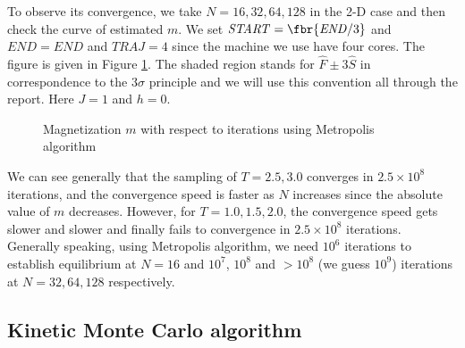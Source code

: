 \documentclass[english, nochinese]{pnote}
\begin{document}
To observe its convergence, we take $ N = 16, 32, 64, 128 $ in the 2-D case and then check the curve of estimated $m$. We set $ \mathit{START} = \fbr{ \mathit{END} / 3 } $ and $ \mathit{END} = \mathit{END} $ and $ \mathit{TRAJ} = 4 $ since the machine we use have four cores. The figure is given in Figure \ref{Fig:Metro}. The shaded region stands for $ \hat{F} \pm 3 \hat{S} $ in correspondence to the $ 3 \sigma $ principle and we will use this convention all through the report. Here $ J = 1 $ and $ h = 0 $.

\begin{figure}[htbp]
\centering
\scalebox{0.666}{}
\caption{Magnetization $m$ with respect to iterations using Metropolis algorithm}
\label{Fig:Metro}
\end{figure}

We can see generally that the sampling of $ T = 2.5, 3.0 $ converges in $ 2.5 \times 10^8 $ iterations, and the convergence speed is faster as $N$ increases since the absolute value of $m$ decreases. However, for $ T = 1.0, 1.5, 2.0 $, the convergence speed gets slower and slower and finally fails to convergence in $ 2.5 \times 10^8 $ iterations. Generally speaking, using Metropolis algorithm, we need $10^6$ iterations to establish equilibrium at $ N = 16 $ and $10^7$, $10^8$ and $ > 10^8 $ (we guess $10^9$) iterations at $ N = 32, 64, 128 $ respectively.

\subsection{Kinetic Monte Carlo algorithm}
\end{document}
